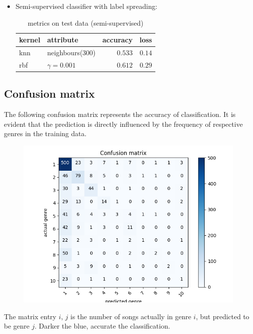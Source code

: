 \documentclass[fleqn,10pt]{SelfArx} %
\begin{document}
\begin{itemize}
	\item Semi-supervised classifier with label spreading:
	\begin{table}[H]
		\caption{metrics on test data (semi-supervised)}
		\centering
		\begin{tabular}{llrr}
			\toprule
			kernel & attribute & accuracy & loss\\ 
			\midrule
			knn & neighbours(300) & $0.533$ & $0.14$ \\
			rbf & $\gamma=0.001$ & $0.612$ & $0.29$ \\
			\bottomrule
		\end{tabular}
		\label{tab:label}
	\end{table}
\end{itemize}

\subsection{Confusion matrix}
The following confusion matrix represents the accuracy of classification. It is evident that the prediction is directly influenced by the frequency of respective genres in the training data.
\begin{figure}[H]
	\includegraphics[width=\linewidth]{confusion-matrix.jpg}
\end{figure}

The matrix entry $i$, $j$ is the number of songs actually in genre $i$, but predicted to be genre $j$. Darker the blue, accurate the classification.
\end{document}
